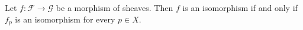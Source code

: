 Let $f\colon \mathcal{F}\to \mathcal{G}$ be a morphism of sheaves. Then
$f$ is an isomorphism if and only if $f_p$ is an isomorphism for every $p \in X$.
